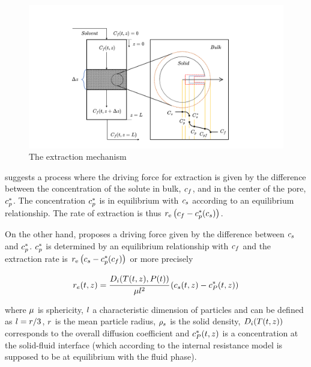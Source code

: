 \documentclass[../Article_Model_Parameters.tex]{subfiles}
\begin{document}
		\begin{figure}[h!]
			\centering
			\includegraphics[trim = 45cm 0cm 60cm 20cm,clip,width=\columnwidth]{Figures/SFE_PFD.drawio.png}	
			\caption{The extraction mechanism}
			\label{fig: SFE_Mechanism}
		\end{figure}
			
		\citet{Bulley1984} suggests a process where the driving force for extraction is given by the difference between the concentration of the solute in bulk, ${\color{black}c_f}$, and in the center of the pore, ${\color{black}c_p^*}$. The concentration ${\color{black}c_p^*}$ is in equilibrium with ${\color{black}c_s}$ according to an equilibrium relationship. The rate of extraction is thus ${\color{black}r_\text{e}}\left({\color{black}c_f} - {\color{black}c^*_p}({\color{black}c_s})\right)$.  
			
		On the other hand, \citet{Reverchon1996} proposes a driving force given by the difference between ${\color{black}c_s}$ and ${\color{black}c_p^*}$. ${\color{black}c_p^*}$ is determined by an equilibrium relationship with ${\color{black}c_f}$ and the extraction rate is ${\color{black}r_\text{e}}\left({\color{black}c_s} - {\color{black}c^*_p}({\color{black}c_f})\right)$ or more precisely
			
			{\footnotesize
				\begin{equation} \label{Model_kinetic_basic}
					{\color{black}r_e}(t,z) = \cfrac{{\color{black}D_i}({\color{black}T}(t,z), {\color{black}P}(t))}{{\color{black} \mu l^2} }\left({\color{black}c_s}(t,z) - {\color{black}c_P^*}(t,z) \right)
			\end{equation} }
			
		where ${\color{black}\mu}$ is sphericity, ${\color{black}l}$ a characteristic dimension of particles and can be defined as ${\color{black}l} = {\color{black}r}/3$, ${\color{black}r}$ is the mean particle radius, ${\color{black}\rho_s}$ is the solid density, ${\color{black}D_i}({\color{black}T}(t,z))$ corresponds to the overall diffusion coefficient and ${\color{black}c_P^*}(t,z)$ is a concentration at the solid-fluid interface (which according to the internal resistance model is supposed to be at equilibrium with the fluid phase). 
			
\end{document}
